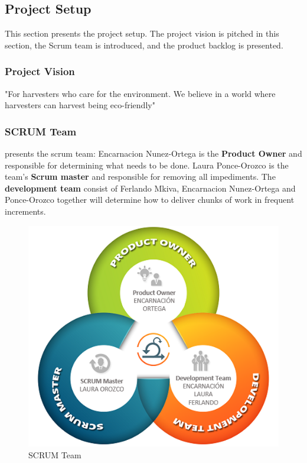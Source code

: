 \subsection{Project Setup} \label{sec:projectSetup}
\noindent This section presents the project setup. The project vision is pitched in this section, the Scrum team is introduced, and the product backlog is presented.

\subsubsection{Project Vision}

"For harvesters who care for the environment. We believe in a world where harvesters can harvest being eco-friendly" 


\subsubsection{SCRUM Team}
\noindent {} presents the scrum team: Encarnacion Nunez-Ortega is the \textbf{Product Owner} and responsible for determining what needs to be done. Laura Ponce-Orozco is the team's \textbf{Scrum master} and responsible for removing all impediments. The \textbf{development team} consist of Ferlando Mkiva, Encarnacion Nunez-Ortega and Ponce-Orozco together will determine how to deliver chunks of work in frequent increments.
\begin{figure}[!ht]
	\centering
	\includegraphics[width=0.6\linewidth]{Graphics/scrumTeam}
	\caption{SCRUM Team}
	\label{fig:scrumTeam}
\end{figure}

